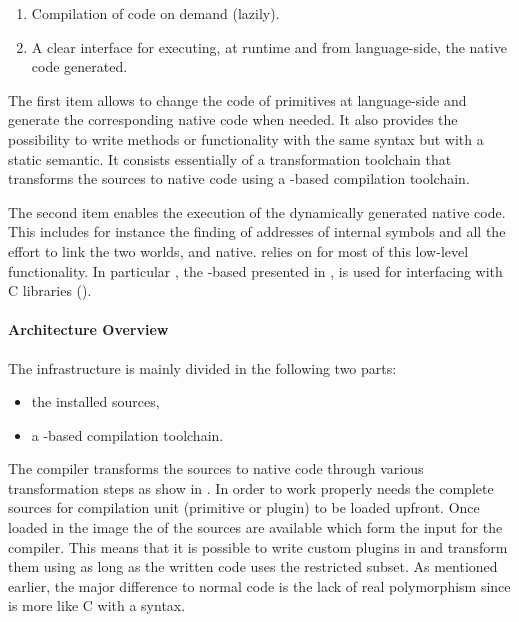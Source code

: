 \begin{enumerate}
	\item Compilation of \Slang code on demand (lazily).
	\item A clear interface for executing, at runtime and from language-side, the native code generated.
\end{enumerate}

\noindent The first item allows to change the code of primitives at language-side and generate the corresponding native code when needed. 
It also provides the possibility to write methods or functionality with the same \ST syntax but with a static semantic. 
It consists essentially of a transformation toolchain that transforms the \Slang sources to native code using a \B-based compilation toolchain.

The second item enables the execution of the dynamically generated native code.
This includes for instance the finding of addresses of \VM internal symbols and all the effort to link the two worlds, \ST and native.
\WF relies on \B for most of this low-level functionality.
In particular \NB, the \B-based \FFI presented in , is used for interfacing with C libraries (). 

\paragraph{Architecture Overview}
The \WF infrastructure is mainly divided in the following two parts: 
\begin{itemize}[nolistsep,noitemsep]
	\item the installed \Slang sources,
	\item a \B-based compilation toolchain.
\end{itemize}
The \WF compiler transforms the \Slang sources to native code through various transformation steps as show in .
In order to work properly \WF needs the complete \Slang sources for compilation unit (primitive or plugin) to be loaded upfront.
Once loaded in the \PH image the \AST of the \Slang sources are available which form the input for the \WF compiler.
This means that it is possible to write custom plugins in \PH and transform them using \WF as long as the written \PH code uses the restricted \Slang subset.
As mentioned earlier, the major difference to normal \PH code is the lack of real polymorphism since \Slang is more like C with a \ST syntax.

